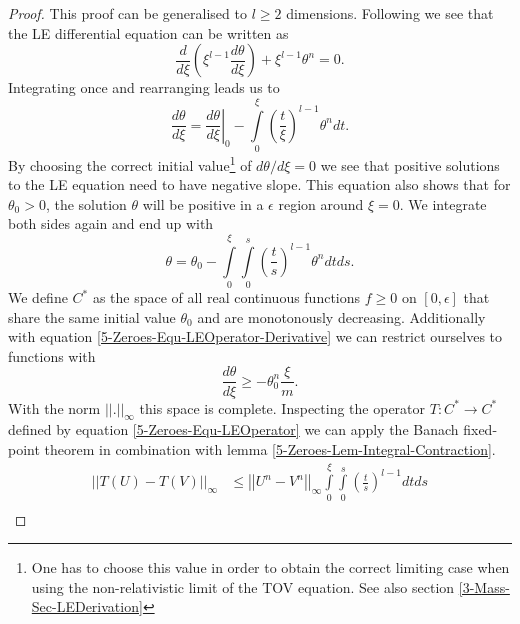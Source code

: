 \begin{proof}
	This proof can be generalised to $l\geq2$ dimensions. 
	Following \cite{quittnerSuperlinearParabolicProblems2007a} we see that the LE differential equation can be written as
	\begin{equation}
		\frac{d}{d\xi}\left(\xi^{l-1}\frac{d\theta}{d\xi}\right) + \xi^{l-1}\theta^n = 0.
	\end{equation}
	Integrating once and rearranging leads us to
	\begin{equation}
		\frac{d\theta}{d\xi} = \left.\frac{d\theta}{d\xi}\right|_0 - \int\limits_0^\xi\left(\frac{t}{\xi}\right)^{l-1}\theta^ndt.
		\label{5-Zeroes-Equ-LEOperator-Derivative}
	\end{equation}
	By choosing the correct initial value\footnote{One has to choose this value in order to obtain the correct limiting case when using the non-relativistic limit of the \ac{TOV} equation. See also section \ref{3-Mass-Sec-LEDerivation}} of $d\theta/d\xi=0$ we see that positive solutions to the LE equation need to have negative slope.
	This equation also shows that for $\theta_0>0$, the solution $\theta$ will be positive in a $\epsilon$ region around $\xi=0$.
	We integrate both sides again and end up with
	\begin{equation}
		\theta = \theta_0 - \int\limits_0^\xi\int\limits_0^s\left(\frac{t}{s}\right)^{l-1}\theta^ndtds.
		\label{5-Zeroes-Equ-LEOperator}
	\end{equation}
	We define $C^*$ as the space of all real continuous functions $f\geq0$ on $[0,\epsilon]$ that share the same initial value $\theta_0$ and are monotonously decreasing.
	Additionally with equation \eqref{5-Zeroes-Equ-LEOperator-Derivative} we can restrict ourselves to functions with
	\begin{equation}
		\frac{d\theta}{d\xi} \geq -\theta_0^n\frac{\xi}{m}.
		\label{5-Zeroes-Equ-LEOperator-Restrict-Slope}
	\end{equation}
	With the norm $||.||_\infty$ this space is complete.
	Inspecting the operator $T:C^*\rightarrow C^*$ defined by
	equation \eqref{5-Zeroes-Equ-LEOperator} we can apply the Banach fixed-point theorem \cite{banachOperationsDansEnsembles1922} in combination with lemma \ref{5-Zeroes-Lem-Integral-Contraction}.
	\begin{align}
		||T(U)-T(V)||_\infty	&\leq	\left|\left|U^n-V^n\right|\right|_\infty\int\limits_0^\xi\int\limits_0^s \left(\frac{t}{s}\right)^{l-1}dtds\\

\end{align}
\end{proof}
